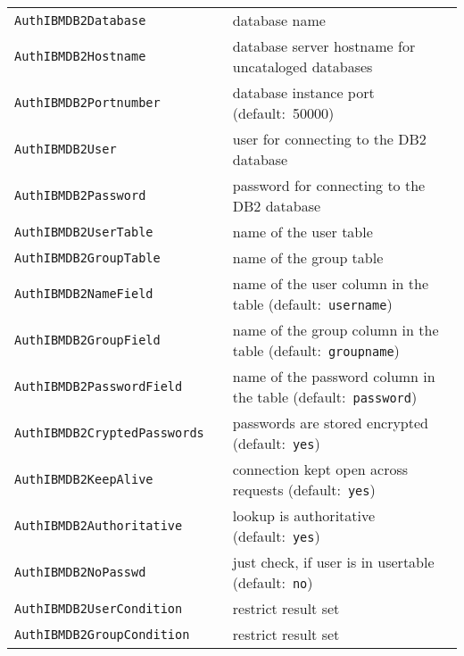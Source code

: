 \documentclass[11pt,letterpaper]{article}
\begin{document}
\begin{tabular}{@{} ll >{\raggedright\arraybackslash}p{ 50ex } @{}}
{\tt AuthIBMDB2Database} & & database name \\

{\tt AuthIBMDB2Hostname} & & database server hostname for uncataloged databases \\

{\tt AuthIBMDB2Portnumber} & & database instance port \mbox{(default: 50000)} \\

{\tt AuthIBMDB2User} & & user for connecting to the DB2 database \\

{\tt AuthIBMDB2Password} & & password for connecting to the DB2 database \\

{\tt AuthIBMDB2UserTable} & & name of the user table \\

{\tt AuthIBMDB2GroupTable} & & name of the group table \\

{\tt AuthIBMDB2NameField} & & name of the user column in the table \mbox{(default: {\tt username})} \\

{\tt AuthIBMDB2GroupField} & & name of the group column in the table \mbox{(default: {\tt groupname})} \\

{\tt AuthIBMDB2PasswordField} & & name of the password column in the table \mbox{(default: {\tt password})} \\

{\tt AuthIBMDB2CryptedPasswords} & & passwords are stored encrypted \mbox{(default: {\tt yes})} \\

{\tt AuthIBMDB2KeepAlive} & & connection kept open across requests \mbox{(default: {\tt yes})} \\

{\tt AuthIBMDB2Authoritative} & & lookup is authoritative \mbox{(default: {\tt yes})} \\ 

{\tt AuthIBMDB2NoPasswd} & & just check, if user is in usertable \mbox{(default: {\tt no})} \\

{\tt AuthIBMDB2UserCondition} & & restrict result set \\

{\tt AuthIBMDB2GroupCondition} & & restrict result set \\


\end{tabular}
\end{document}

